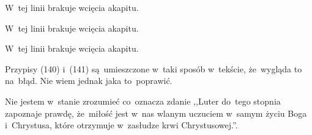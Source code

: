 \documentclass[a4paper,11pt]{article}
\begin{document}
\start {} W~tej linii brakuje wcięcia akapitu.

\vspace{\spaceFour}


\start {} W~tej linii brakuje wcięcia akapitu.

\vspace{\spaceFour}


\start {} W~tej linii brakuje wcięcia akapitu.

\vspace{\spaceFour}


\start {} Przypisy (140) i~(141) są~umieszczone w~taki sposób w~tekście, że~wygląda to na~błąd. Nie wiem jednak jaka to~poprawić.

\vspace{\spaceFour}


\start {} Nie jestem w~stanie zrozumieć co~oznacza zdanie
,,Luter do~tego stopnia zapoznaje prawdę, że~miłość jest w~nas wlanym
uczuciem w~samym życiu Boga i~Chrystusa, które otrzymuje w~zasłudze
krwi Chrystusowej.''.

\vspace{\spaceFour}
\end{document}
